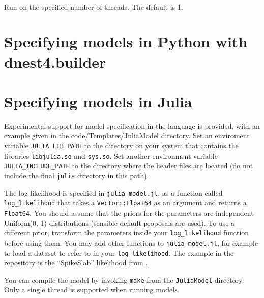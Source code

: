 \documentclass[article]{jss}
\begin{document}
\\
Run on the specified number of threads. The default is 1.

\section{Specifying models in Python with dnest4.builder}


\section{Specifying models in Julia}
Experimental support for model specification in the
 language is provided, with an example given in the
code/Templates/JuliaModel directory.
Set an enviroment variable {\tt JULIA\_LIB\_PATH} to the directory on your
system that contains the libraries {\tt libjulia.so} and
{\tt sys.so}. Set another environment variable {\tt JULIA\_INCLUDE\_PATH}
to the directory where the  header files are located
(do not include the final {\tt julia} directory in this path).

The log likelihood is specified in {\tt julia\_model.jl}, as a function
called {\tt log\_likelihood} that takes a {\tt Vector::Float64} as an argument
and returns a {\tt Float64}. You should assume that the priors for the
parameters are independent Uniform(0, 1) distributions (sensible default
proposals are used). To use a different prior, transform the parameters inside
your {\tt log\_likelihood} function before using them.
You may add other functions to {\tt julia\_model.jl}, for example to load
a dataset to refer to in your {\tt log\_likelihood}. The example in
the repository is the ``SpikeSlab'' likelihood from \citet{dnest}.

You can compile the model by invoking {\tt make}
from the {\tt JuliaModel} directory.
Only a single thread is supported when running 
models.
\end{document}
